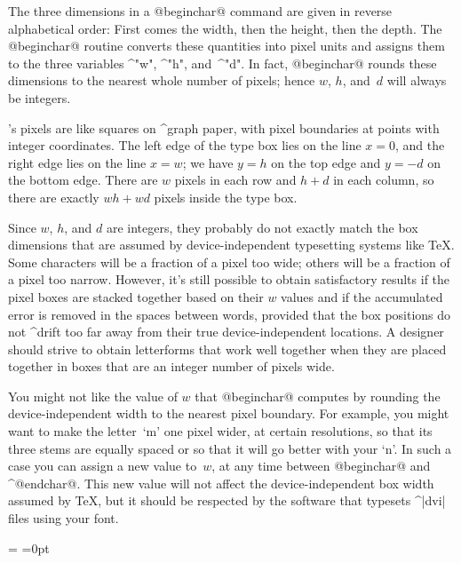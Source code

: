 {{{{The three dimensions in a @beginchar@ command are given in reverse
alphabetical order: First comes the width, then the height, then the depth.
The @beginchar@ routine converts these quantities into pixel units
and assigns them to the three variables ^"w", ^"h", and~^"d". In fact,
@beginchar@ rounds these dimensions to the nearest whole number of
pixels; hence $w$, $h$, and~$d$ will always be integers.

\MF's pixels are like squares on ^{graph paper}, with pixel boundaries
at points with integer coordinates. The left edge of the type box lies
on the line $x=0$, and the right edge lies on the line $x=w$; we have
$y=h$ on the top edge and $y=-d$ on the bottom edge. There are $w$ pixels
in each row and $h+d$ in each column, so there are exactly $wh+wd$ pixels
inside the type box.

Since $w$, $h$, and $d$ are integers, they probably do not exactly match
the box dimensions that are assumed by device-independent typesetting
systems like \TeX. Some characters will be a fraction of a pixel too wide;
others will be a fraction of a pixel too narrow. However, it's still possible
to obtain satisfactory results if the pixel boxes are stacked together
based on their $w$ values and if the accumulated error is removed in the
spaces between words, provided that the box positions do not ^{drift}
too far away from their true device-independent locations. A designer should
strive to obtain letterforms that work well together when they are placed
together in boxes that are an integer number of pixels wide.

\ddanger You might not like the value of $w$ that @beginchar@ computes by
rounding the device-independent width to the nearest pixel boundary.
For example, you might want to make the letter~`m' one pixel wider, at
certain resolutions, so that its three stems are equally spaced or so that
it will go better with your `n'. In such a case you can assign a new value
to~$w$, at any time between @beginchar@ and ^@endchar@. This new value
will not affect the device-independent box width assumed by \TeX, but it
should be respected by the software that typesets ^|dvi| files using your font.

\def\hidecoords(#1,#2){\hbox to 0pt{\hss$\scriptstyle(#1,#2)$\hss}}
=\vtop{\kern -94pt
  \rightline{\vbox{\hbox to 140\apspix{\hidecoords(0,h)\hfil
        \hidecoords(w\mkern-2mu,h)}
      \kern3pt
      \figbox{12a}{140\apspix}{360\apspix}\vbox
      \kern-3pt
      \hbox to 140\apspix{\hidecoords(0,-d)\hfil
        \hidecoords(w\mkern-2mu,-d)}}\quad}}
=0pt

}}}}
